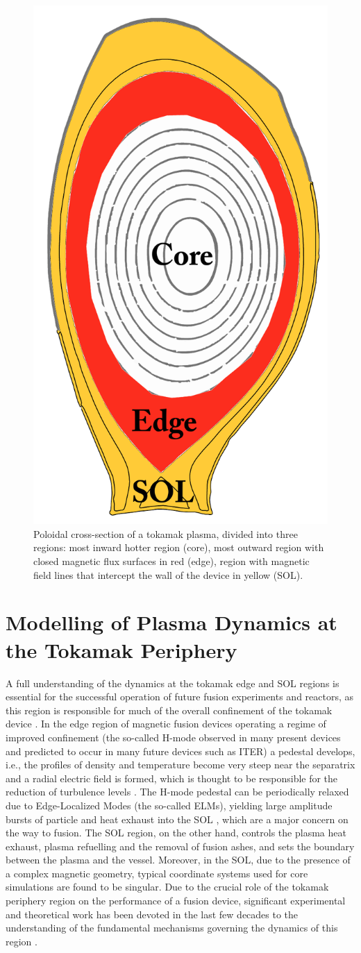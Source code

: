 \begin{figure}
    \centering
    \includegraphics[width=.35\textwidth]{images/Core_Edge_Sol.pdf}
    \caption{Poloidal cross-section of a tokamak plasma, divided into three regions: most inward hotter region (core), most outward region with closed magnetic flux surfaces in red (edge), region with magnetic field lines that intercept the wall of the device in yellow (SOL).}
    \label{fig:plasmaboundary}
\end{figure}

\section{Modelling of Plasma Dynamics at the Tokamak Periphery}
\label{sec:plasmamodelling}

A full understanding of the dynamics at the tokamak edge and SOL regions is essential for the successful operation of future fusion experiments and reactors, as this region is responsible for much of the overall confinement of the tokamak device \citep{Ricci2015}.
%
In the edge region of magnetic fusion devices operating a regime of improved confinement (the so-called H-mode observed in many present devices and predicted to occur in many future devices such as ITER) a pedestal develops, i.e., the profiles of density and temperature become very steep near the separatrix and a radial electric field is formed, which is thought to be responsible for the reduction of turbulence levels \citep{Wagner1984}.
%
The H-mode pedestal can be periodically relaxed due to Edge-Localized Modes (the so-called ELMs), yielding large amplitude bursts of particle and heat exhaust into the SOL \citep{Leonard2014}, which are a major concern on the way to fusion.
%
The SOL region, on the other hand, controls the plasma heat exhaust, plasma refuelling and the removal of fusion ashes, and sets the boundary between the plasma and the vessel.
%
Moreover, in the SOL, due to the presence of a complex magnetic geometry, typical coordinate systems used for core simulations are found to be singular.
%
Due to the crucial role of the tokamak periphery region on the performance of a fusion device, significant experimental and theoretical work has been devoted in the last few decades to the understanding of the fundamental mechanisms governing the dynamics of this region \citep{Loarte2007}.


